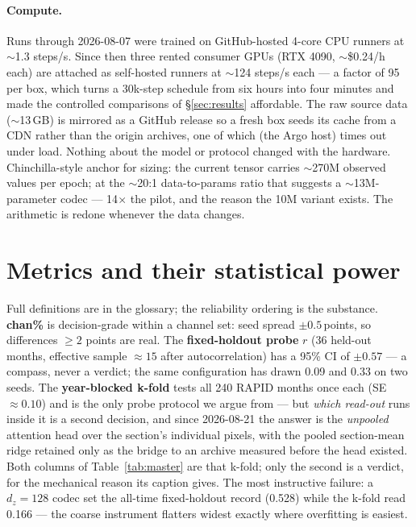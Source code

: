 \documentclass[10pt]{article}
\begin{document}
\paragraph{Compute.} Runs through 2026-08-07 were trained on
GitHub-hosted 4-core CPU runners at $\sim$1.3 steps/s. Since then
three rented consumer GPUs (RTX 4090, $\sim$\$0.24/h each) are
attached as self-hosted runners at $\sim$124 steps/s each --- a factor
of 95 per box, which turns a 30k-step schedule from six hours into four
minutes and made the controlled comparisons of \S\ref{sec:results}
affordable. The raw source data ($\sim$13\,GB) is mirrored as a GitHub
release so a fresh box seeds its cache from a CDN rather than the
origin archives, one of which (the Argo host) times out under load.
Nothing about the model or protocol changed with the hardware.
Chinchilla-style anchor for sizing: the current tensor carries
$\sim$270M observed values per epoch; at the $\sim$20:1 data-to-params
ratio that suggests a $\sim$13M-parameter codec --- 14$\times$ the
pilot, and the reason the 10M variant exists. The arithmetic is redone
whenever the data changes.

\section{Metrics and their statistical power}\label{sec:metrics}

Full definitions are in the glossary; the reliability ordering is the
substance. \textbf{chan\%} is decision-grade within a channel set: seed
spread $\pm0.5$\,points, so differences $\ge2$ points are real. The
\textbf{fixed-holdout probe} $r$ (36 held-out months, effective sample
$\approx15$ after autocorrelation) has a 95\% CI of $\pm0.57$ --- a
compass, never a verdict; the same configuration has drawn 0.09 and
0.33 on two seeds. The \textbf{year-blocked k-fold} tests all 240 RAPID
months once each (SE $\approx0.10$) and is the only probe protocol we
argue from --- but \emph{which read-out} runs inside it is a second
decision, and since 2026-08-21 the answer is the \emph{unpooled}
attention head over the section's individual pixels, with the pooled
section-mean ridge retained only as the bridge to an archive measured
before the head existed. Both columns of Table~\ref{tab:master} are that
k-fold; only the second is a verdict, for the mechanical reason its
caption gives. The most instructive failure: a $d_z{=}128$ codec set the
all-time fixed-holdout record (0.528) while the k-fold read 0.166 ---
the coarse instrument flatters widest exactly where overfitting is
easiest.
\end{document}
